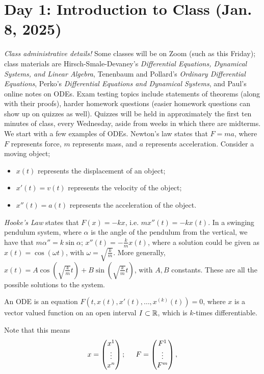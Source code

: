 \section{Day 1: Introduction to Class (Jan. 8, 2025)}
\textit{Class administrative details!} Some classes will be on Zoom (such as this Friday); class materials are Hirsch-Smale-Devaney's \textit{Differential Equations, Dynamical Systems, and Linear Algebra}, Tenenbaum and Pollard's \textit{Ordinary Differential Equations}, Perko's \textit{Differential Equations and Dynamical Systems}, and Paul's online notes on ODEs.
\medskip\newline
Exam testing topics include statements of theorems (along with their proofs), harder homework questions (easier homework questions can show up on quizzes as well). Quizzes will be held in approximately the first ten minutes of class, every Wednesday, aside from weeks in which there are midterms.
\medskip\newline
We start with a few examples of ODEs. Newton's law states that $F = ma$, where $F$ represents force, $m$ represents mass, and $a$ represents acceleration. Consider a moving object;
\begin{itemize}
    \item $x(t)$ represents the displacement of an object;
    \item $x'(t) = v(t)$ represents the velocity of the object;
    \item $x''(t) = a(t)$ represents the acceleration of the object.
\end{itemize}
\textit{Hooke's Law} states that $F(x) = - kx$, i.e. $m x''(t) = - k x(t)$. In a swinging pendulum system, where $\alpha$ is the angle of the pendulum from the vertical, we have that $m \alpha '' = k \sin \alpha$; $x''(t) = -\frac{k}{m} x(t)$, where a solution could be given as $x(t) = \cos (\omega t)$, with $\omega = \sqrt{\frac{k}{m}}$. More generally, $x(t) = A \cos (\sqrt{\frac{k}{m}} t) + B \sin (\sqrt{\frac{k}{m}} t)$, with $A, B$ constants. These are all the possible solutions to the system.
\begin{definition}
    An ODE is an equation $F(t, x(t), x'(t), \dots, x^{(k)}(t)) = 0$, where $x$ is a vector valued function on an open interval $I \subset \mathbb R$, which is $k$-times differentiable.
\end{definition}
\noindent Note that this means
\[ x = \begin{pmatrix} x^1 \\ \vdots \\ x^n \end{pmatrix}; \hspace{0.2in} F = \begin{pmatrix} F^1 \\ \vdots \\ F^m \end{pmatrix}, \]
